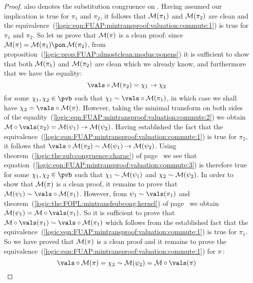 \begin{proof}
also denotes the substitution congruence on \pv. Having assumed our
implication is true for $\pi_{1}$ and $\pi_{2}$, it follows that
${\cal M}(\pi_{1})$ and ${\cal M}(\pi_{2})$ are clean and the
equivalence~(\ref{logic:eqn:FUAP:mintransproof:valuation:commute:1})
is true for $\pi_{1}$ and $\pi_{2}$. So let us prove that ${\cal
M}(\pi)$ is a clean proof: since ${\cal M}(\pi)={\cal
M}(\pi_{1})\pon\,{\cal M}(\pi_{2})$, from
proposition~(\ref{logic:prop:FUAP:almostclean:modus:ponens}) it is
sufficient to show that both ${\cal M}(\pi_{1})$ and ${\cal
M}(\pi_{2})$ are clean which we already know, and furthermore that
we have the equality:
    \begin{equation}\label{logic:eqn:FUAP:mintransproof:valuation:commute:3}
    \vals\circ{\cal M}(\pi_{2})=\chi_{1}\to\chi_{2}
    \end{equation}
for some $\chi_{1},\chi_{2}\in\pvb$ such that
$\chi_{1}\sim\vals\circ{\cal M}(\pi_{1})$, in which case we shall
have $\chi_{2}=\vals\circ{\cal M}(\pi)$. However, taking the minimal
transform on both sides of the
equality~(\ref{logic:eqn:FUAP:mintransproof:valuation:commute:2}) we
obtain ${\cal M}\circ\vals(\pi_{2})={\cal M}(\psi_{1})\to{\cal
M}(\psi_{2})$. Having established the fact that the
equivalence~(\ref{logic:eqn:FUAP:mintransproof:valuation:commute:1})
is true for $\pi_{2}$, it follows that $\vals\circ{\cal
M}(\pi_{2})\sim{\cal M}(\psi_{1})\to{\cal M}(\psi_{2})$. Using
theorem~(\ref{logic:the:sub:congruence:charac}) of
page~\pageref{logic:the:sub:congruence:charac} we see that
equation~(\ref{logic:eqn:FUAP:mintransproof:valuation:commute:3}) is
therefore true for some $\chi_{1},\chi_{2}\in\pvb$ such that
$\chi_{1}\sim{\cal M}(\psi_{1})$ and $\chi_{2}\sim{\cal
M}(\psi_{2})$. In order to show that ${\cal M}(\pi)$ is a clean
proof, it remains to prove that ${\cal
M}(\psi_{1})\sim\vals\circ{\cal M}(\pi_{1})$. However, from
$\psi_{1}\sim\vals(\pi_{1})$ and
theorem~(\ref{logic:the:FOPL:mintransfsubcong:kernel}) of
page~\pageref{logic:the:FOPL:mintransfsubcong:kernel} we obtain
${\cal M}(\psi_{1})={\cal M}\circ\vals(\pi_{1})$. So it is
sufficient to prove that ${\cal
M}\circ\vals(\pi_{1})\sim\vals\circ{\cal M}(\pi_{1})$ which follows
from the established fact that the
equivalence~(\ref{logic:eqn:FUAP:mintransproof:valuation:commute:1})
is true for $\pi_{1}$. So we have proved that ${\cal M}(\pi)$ is a
clean proof and it remains to prove the
equivalence~(\ref{logic:eqn:FUAP:mintransproof:valuation:commute:1})
for $\pi$\,:
    \[
    \vals\circ{\cal M}(\pi)=\chi_{2}
    \sim{\cal M}(\psi_{2})
    ={\cal M}\circ\vals(\pi)
\]
\end{proof}
